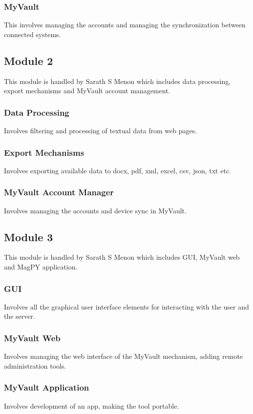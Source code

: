 \documentclass[a4paper]{report}
\begin{document}
\subsubsection{MyVault}
\large\textnormal{This involves managing the accounts and managing the synchronization between connected systems.}
\subsection{Module 2}
\large\textnormal{This module is handled by Sarath S Menon which includes data processing, export mechanisms and MyVault account management.}
\subsubsection{Data Processing}
\large\textnormal{Involves filtering and processing of textual data from web pages.}
\subsubsection{Export Mechanisms}
\large\textnormal{Involves exporting available data to docx, pdf, xml, excel, csv, json, txt etc.}
\subsubsection{MyVault Account Manager}
\large\textnormal{Involves managing the accounts and device sync in MyVault.}
\subsection{Module 3}
\large\textnormal{This module is handled by Sarath S Menon which includes GUI, MyVault web and MagPY application.}
\subsubsection{GUI}
\large\textnormal{Involves all the graphical user interface elements for interacting with the user and the server.}

\subsubsection{MyVault Web}
\large\textnormal{Involves managing the web interface of the MyVault mechanism, adding remote administration tools.}

\subsubsection{MyVault Application}
\large\textnormal{Involves development of an app, making the tool portable.}
\newpage
\end{document}
